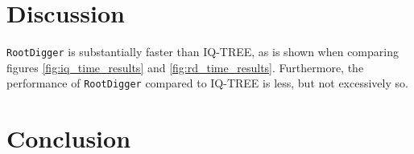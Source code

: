 \documentclass{article}
\newcommand{\RootDiggertt}{\texttt{RootDigger}}
\begin{document}
\section{Discussion}


\RootDiggertt{} is substantially faster than IQ-TREE, as is shown when comparing
figures \ref{fig:iq_time_results} and \ref{fig:rd_time_results}. Furthermore,
the performance of \RootDiggertt{} compared to IQ-TREE is less, but not
excessively so.


\section{Conclusion}



\end{document}
